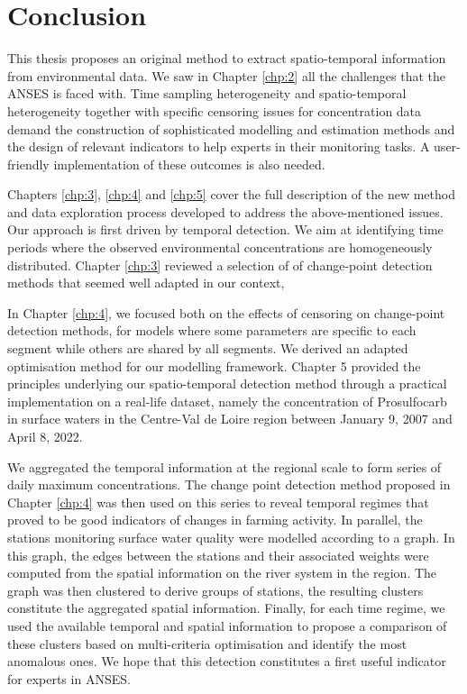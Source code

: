 

\chapter{Conclusion}

This thesis proposes an original method to extract spatio-temporal information from environmental data. We saw in Chapter \ref{chp:2} all the challenges that the ANSES is faced with. Time sampling heterogeneity and spatio-temporal heterogeneity together with specific censoring issues for concentration data demand the construction of sophisticated modelling and estimation methods and the design of relevant indicators to help experts in their monitoring tasks. A user-friendly implementation of these outcomes is also needed.

Chapters \ref{chp:3}, \ref{chp:4} and \ref{chp:5} cover the full description of the new method and data exploration process developed to address the above-mentioned issues.  Our approach is first driven by temporal detection. We aim at identifying time periods where the observed environmental concentrations are homogeneously distributed. Chapter \ref{chp:3} reviewed a selection of of change-point detection methods that seemed well adapted in our context, 

In Chapter \ref{chp:4}, we focused both on the effects of censoring on change-point detection methods, for models where some parameters are specific to each segment while others are shared by all segments. We derived an adapted optimisation method for our modelling framework. Chapter 5 provided the principles underlying our spatio-temporal detection method through a practical implementation on a real-life dataset, namely the concentration of Prosulfocarb in surface waters in the Centre-Val de Loire region between January 9, 2007 and April 8, 2022.   

We aggregated the temporal information at the regional scale to form series of daily maximum concentrations. The change point detection method proposed in Chapter \ref{chp:4} was then used on this series to reveal temporal regimes that proved to be good indicators of changes in farming activity.  In parallel, the stations monitoring surface water quality were modelled according to a graph. In this graph, the edges between the stations and their associated weights were computed from the spatial information on the river system in the region. The graph was then clustered to derive groups of stations, the resulting clusters constitute the aggregated spatial information. Finally, for each time regime, we used the available temporal and spatial information to propose a comparison of these clusters based on multi-criteria optimisation and identify the most anomalous ones. We hope that this detection constitutes a first useful indicator for experts in ANSES. 

